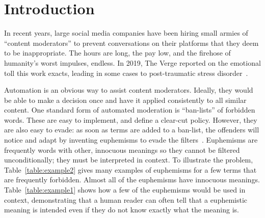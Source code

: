 \section{Introduction}
\label{sec:intro}


In recent years,
large social media companies have been hiring small armies of ``content moderators''
to prevent conversations on their platforms 
that they deem to be inappropriate.
The hours are long, 
the pay low, 
and the firehose of humanity's worst impulses, endless.
In 2019, The Verge reported on the emotional toll this work exacts,
leading in some cases
to post-traumatic stress disorder~\cite{TheVerge:Mods, TheVerge:Mods2}.

Automation is an obvious way to assist content moderators.
Ideally, they would be able to make a decision once
and have it applied consistently to all similar content.
One standard form of automated moderation is ``ban-lists'' of forbidden words.
These are easy to implement, and define a clear-cut policy.
However, they are also easy to evade:
as soon as terms are added to a ban-list,
the offenders will notice
and adapt by inventing euphemisms to evade the filters~\cite{Ofcom:AI2019}.
Euphemisms are frequently words with other, innocuous meanings
so they cannot be filtered unconditionally;
they must be interpreted in context.
To illustrate the problem,
Table~\ref{table:example2} gives many examples of euphemisms
for a few terms that are frequently forbidden.
Almost all of the euphemisms have innocuous meanings.
Table~\ref{table:example1} shows how a few of the euphemisms
would be used in context, demonstrating that
a human reader can often tell that a euphemistic meaning is intended
even if they do not know exactly what the meaning is.

